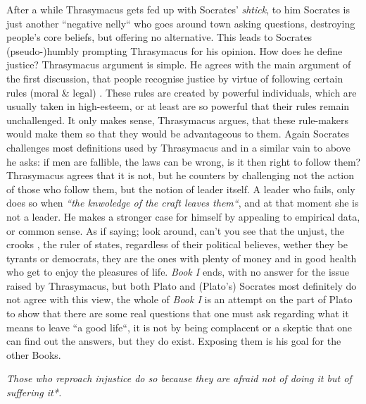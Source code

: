 \documentclass[english,course]{Notes}
\newcommand{\ita}[1]{\textit{#1}}
\newcommand\quo[1]{\begin{displayquote}\ita{\large{#1}}\end{displayquote}}
\begin{document}
\par{After a while Thrasymacus gets fed up with Socrates' \ita{shtick}, to him Socrates is just another ``negative nelly`` who goes around town asking questions, destroying people's core beliefs, but offering no alternative. This leads to Socrates (pseudo-)humbly prompting Thrasymacus for his opinion. How does he define justice? Thrasymacus argument is simple. He agrees with the main argument of the first discussion, that people recognise justice by virtue of following certain rules (moral \& legal) . These rules are created by powerful individuals, which are usually taken in high-esteem, or at least are so powerful that their rules remain unchallenged. It only makes sense, Thrasymacus argues, that these rule-makers would make them so that they would be advantageous to them. Again Socrates challenges most definitions used by Thrasymacus and in a similar vain to above he asks: if men are fallible, the laws can be wrong, is it then right to follow them? Thrasymacus agrees that it is not, but he counters by challenging not the action of those who follow them, but the notion of leader itself. A leader who fails, only does so when \ita{``the knwoledge of the craft leaves them``}, and at that moment she is not a leader. He makes a stronger case for himself by appealing to empirical data, or common sense. As if saying; look around,  can't you see that the unjust, the crooks , the ruler of states, regardless of their political believes, wether they be tyrants or democrats, they are the ones with plenty of money and in good health who get to enjoy the pleasures of life. \ita{Book I} ends, with no answer for the issue raised by Thrasymacus, but both Plato and (Plato's) Socrates most definitely do not agree with this view, the whole of \ita{Book I} is an attempt on the part of Plato to show that there are some real questions that one must ask regarding what it means to leave ``a good life``, it is not by being complacent or a skeptic that one can find out the answers, but they do exist. Exposing them is his goal for the other Books.}

\quo{Those who reproach injustice do so because they are afraid not of doing it but of suffering it*.}
\end{document}
